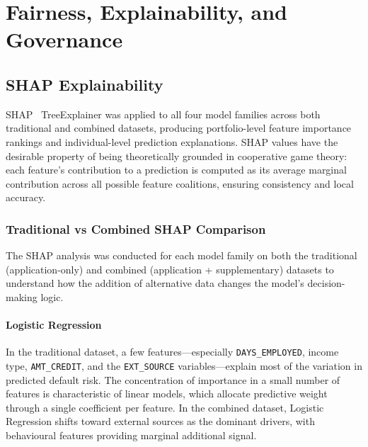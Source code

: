 \chapter{Fairness, Explainability, and Governance}
\label{chap:fairness}

\section{SHAP Explainability}
\label{sec:shap}

\ac{SHAP}~\cite{lundberg2017} TreeExplainer was applied to all four model families across both traditional and combined datasets, producing portfolio-level feature importance rankings and individual-level prediction explanations. SHAP values have the desirable property of being theoretically grounded in cooperative game theory: each feature's contribution to a prediction is computed as its average marginal contribution across all possible feature coalitions, ensuring consistency and local accuracy.

\subsection{Traditional vs Combined SHAP Comparison}

The SHAP analysis was conducted for each model family on both the traditional (application-only) and combined (application + supplementary) datasets to understand how the addition of alternative data changes the model's decision-making logic.

\subsubsection{Logistic Regression}



In the traditional dataset, a few features---especially \texttt{DAYS\_EMPLOYED}, income type, \texttt{AMT\_CREDIT}, and the \texttt{EXT\_SOURCE} variables---explain most of the variation in predicted default risk. The concentration of importance in a small number of features is characteristic of linear models, which allocate predictive weight through a single coefficient per feature. In the combined dataset, Logistic Regression shifts toward external sources as the dominant drivers, with behavioural features providing marginal additional signal.


